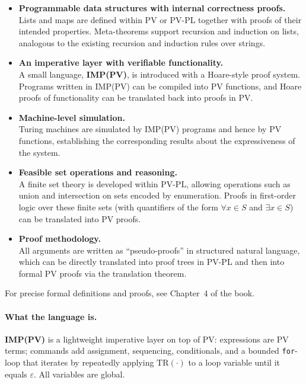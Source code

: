 \begin{itemize}
  \item \textbf{Programmable data structures with internal correctness proofs.} \\
  Lists and maps are defined within PV or PV-PL together with proofs of their intended properties. Meta-theorems support recursion and induction on lists, analogous to the existing recursion and induction rules over strings.

  \item \textbf{An imperative layer with verifiable functionality.} \\
  A small language, \textbf{IMP(PV)}, is introduced with a Hoare-style proof system. Programs written in IMP(PV) can be compiled into PV functions, and Hoare proofs of functionality can be translated back into proofs in PV.

  \item \textbf{Machine-level simulation.} \\
  Turing machines are simulated by IMP(PV) programs and hence by PV functions, establishing the corresponding results about the expressiveness of the system.

  \item \textbf{Feasible set operations and reasoning.} \\
  A finite set theory is developed within PV-PL, allowing operations such as union and intersection on sets encoded by enumeration. Proofs in first-order logic over these finite sets (with quantifiers of the form $\forall x \in S$ and $\exists x \in S$) can be translated into PV proofs.

  \item \textbf{Proof methodology.} \\
  All arguments are written as ``pseudo-proofs'' in structured natural language, which can be directly translated into proof trees in PV-PL and then into formal PV proofs via the translation theorem.
\end{itemize}

\noindent
For precise formal definitions and proofs, see Chapter~4 of the book.

\paragraph{What the language is.}
\textbf{IMP(PV)} is a lightweight imperative layer on top of PV: expressions are PV terms; commands add assignment, sequencing, conditionals, and a bounded \texttt{for}-loop that iterates by repeatedly applying \(\mathrm{TR}(\cdot)\) to a loop variable until it equals \(\varepsilon\).
All variables are global.

